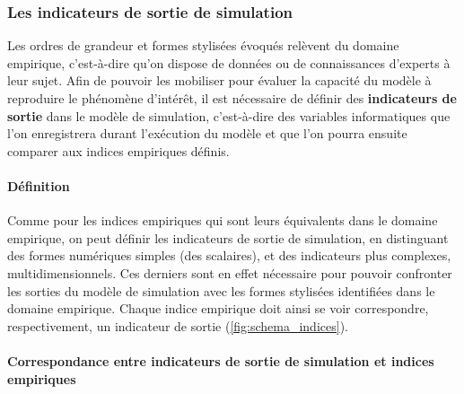 
\subsubsection{Les indicateurs de sortie de simulation}


Les ordres de grandeur et formes stylisées évoqués relèvent du domaine empirique, c'est-à-dire qu'on dispose de données ou de connaissances d'experts à leur sujet.
Afin de pouvoir les mobiliser pour évaluer la capacité du modèle à reproduire le phénomène d'intérêt, il est nécessaire de définir des \textbf{indicateurs de sortie} dans le modèle de simulation, c'est-à-dire des variables informatiques que l'on enregistrera durant l'exécution du modèle et que l'on pourra ensuite comparer aux indices empiriques définis.


\paragraph{Définition}
Comme pour les indices empiriques qui sont leurs équivalents dans le domaine empirique, on peut définir les indicateurs de sortie de simulation, en distinguant des formes numériques simples (des scalaires), et des indicateurs plus complexes, multidimensionnels.
Ces derniers sont en effet nécessaire pour pouvoir confronter les sorties du modèle de simulation avec les formes stylisées identifiées dans le domaine empirique.
Chaque indice empirique doit ainsi se voir correspondre, respectivement, un indicateur de sortie (\cref{fig:schema_indices}).

\paragraph{Correspondance entre indicateurs de sortie de simulation et indices empiriques}\label{par:correspondance}


